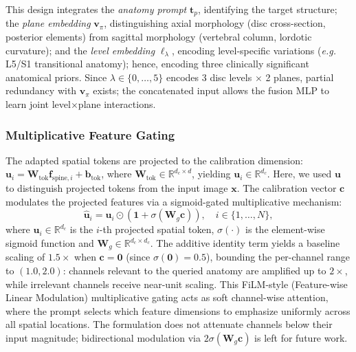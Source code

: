 \documentclass[journal]{IEEEtran}
\makeatletter
\newcommand{\eg}{\textit{e.g.}\@\xspace}
\makeatother
\begin{document}
This design integrates the \emph{anatomy prompt} $\mathbf{t}_p$, identifying the target structure; the \emph{plane embedding} $\mathbf{v}_\pi$, distinguishing axial morphology (disc cross-section, posterior elements) from sagittal morphology (vertebral column, lordotic curvature); and the \emph{level embedding} $\boldsymbol\ell_\lambda$, encoding level-specific variations (\eg L5/S1 transitional anatomy); hence, encoding three clinically significant anatomical priors. Since $\lambda \in \{0,\ldots,5\}$ encodes 3 disc levels $\times$ 2 planes, partial redundancy with $\mathbf{v}_\pi$ exists; the concatenated input allows the fusion MLP to learn joint level$\times$plane interactions.

\subsubsection{Multiplicative Feature Gating}
\label{sec:gating}
The adapted spatial tokens are projected to the calibration dimension: $\mathbf{u}_i = \mathbf{W}_{\text{tok}} \mathbf{f}_{\text{spine},i} + \mathbf{b}_{\text{tok}}$, where $\mathbf{W}_{\text{tok}} \in \mathbb{R}^{d_c \times d}$, yielding $\mathbf{u}_i \in \mathbb{R}^{d_c}$. Here, we used $\mathbf{u}$ to distinguish projected tokens from the input image $\mathbf{x}$.
The calibration vector $\mathbf{c}$ modulates the projected features via a sigmoid-gated multiplicative mechanism:
\begin{equation}
    \hat{\mathbf{u}}_i = \mathbf{u}_i \odot \left(\mathbf{1} + \sigma\!\left(\mathbf{W}_g   \mathbf{c}\right)\right), \quad i \in \{1, \ldots, N\},
    \label{eq:gate}
\end{equation}
where $\mathbf{u}_i \in \mathbb{R}^{d_c}$ is the $i$-th projected spatial token, $\sigma(\cdot)$ is the element-wise sigmoid function and $\mathbf{W}_g \in \mathbb{R}^{d_c \times d_c}$. The additive identity term yields a baseline scaling of $1.5\times$ when $\mathbf{c}=\mathbf{0}$ (since $\sigma(\mathbf{0})=0.5$), bounding the per-channel range to $(1.0, 2.0)$: channels relevant to the queried anatomy are amplified up to $2\times$, while irrelevant channels receive near-unit scaling. This FiLM-style (Feature-wise Linear Modulation) \cite{perez2018film} multiplicative gating acts as soft channel-wise attention, where the prompt selects which feature dimensions to emphasize uniformly across all spatial locations. The formulation does not attenuate channels below their input magnitude; bidirectional modulation via $2\sigma(\mathbf{W}_g \mathbf{c})$ is left for future work.
\end{document}
